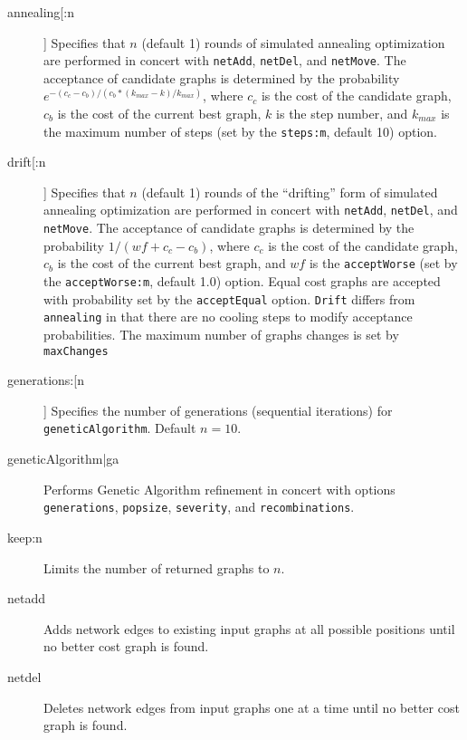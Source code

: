 		\begin{description}
		\item[annealing[:n]] Specifies that $n$ (default 1) rounds of simulated annealing optimization 
		\citep{Metropolisetal1953, Kirkpatricketal1983, Cerny1985} are performed in concert with 
		\texttt{netAdd}, \texttt{netDel}, and \texttt{netMove}. The acceptance of candidate graphs is 
		determined by the probability $e ^ {- (c_c - c_b)/ (c_b * (k_{max} -k)/ k_{max})}$, where $c_c$ 
		is the cost of the candidate graph, $c_b$ is the cost of the current best graph, $k$ is the step number, 
		and $k_{max}$ is the maximum number of steps (set by the \texttt{steps:m}, default 10) option.
			
		\item[drift[:n]] Specifies that $n$ (default 1) rounds of the ``drifting'' form of simulated annealing \citep{goloboff1999} 
		optimization are performed in concert with \texttt{netAdd}, 	\texttt{netDel}, and \texttt{netMove}. The acceptance of 
		candidate graphs is determined by the probability $1/ (wf + c_c - c_b)$, where $c_c$ is the cost of the candidate 
		graph, $c_b$ is the cost of the current best graph, and $wf$ is the \texttt{acceptWorse} (set by the 
		\texttt{acceptWorse:m}, default 1.0) option. Equal cost graphs are accepted with probability set by the 
		\texttt{acceptEqual} option. \texttt{Drift} differs from \texttt{annealing} in that there are no cooling steps to modify 
		acceptance probabilities. The maximum number of graphs changes is set by \texttt{maxChanges}
			
		\item[generations:[n]] Specifies the number of generations (sequential iterations) for \texttt{geneticAlgorithm}. 
		Default $n=10$.
			
		\item[geneticAlgorithm|ga] Performs Genetic Algorithm \citep{Holland1975} refinement in concert with options \\
		\texttt{generations}, \texttt{popsize}, \texttt{severity}, and \texttt{recombinations}. 
			
		\item[keep:n] Limits the number of returned graphs to $n$. 
		
		\item[netadd] Adds network edges to existing input graphs at all possible positions until no better cost graph is found.
			
		\item[netdel] Deletes network edges from input graphs one at a time until no better cost 
		graph is found.
			

\end{description}
